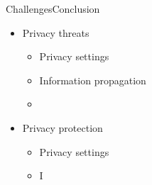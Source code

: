 \begin{frame}[bg]{Challenges}{Conclusion}
	\begin{itemize}
		\item Privacy threats
			\begin{itemize}
				\item Privacy settings
				\item Information propagation
				\item 
			\end{itemize}
		\item Privacy protection
			\begin{itemize}
				\item Privacy settings
				\item I
			\end{itemize}
	\end{itemize}
	
	\bey
\end{frame}

